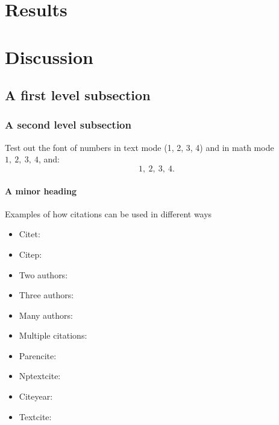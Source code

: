 \documentclass{mpi-far}
\begin{document}
\section{Results}
\section{Discussion}

\subsection{A first level subsection}
\subsubsection{A second level subsection}

Test out the font of  numbers in text mode (1, 2, 3, 4) and in math mode $1,\ 2,\ 3,\ 4$, and:
$$
1,\ 2,\ 3,\ 4 .
$$

\lipsum[3]


\paragraph{A minor heading}
\lipsum[5]

Examples of how citations can be used in different ways

\begin{itemize}
  \item Citet: \citet{baker_nzclassification_2010}
  \item Citep: \citep{doc_sealion_2009}
  \item Two authors: \citet{abraham_summary_98-09}
  \item Three authors: \citep{thompson_dolphin_2013}
  \item Many authors: \citep{baker_global_2007}
  \item Multiple citations: \citep{baker_global_2007, abraham_summary_98-09, thompson_dolphin_2013}
  \item Parencite: \parencite{gales_phocarctos_2008}
  \item Nptextcite: 
  \item Citeyear: \citeyear{robertson_population_2011}
  \item Textcite: \textcite{roe_necropsy_2007}
\end{itemize}
\end{document}
